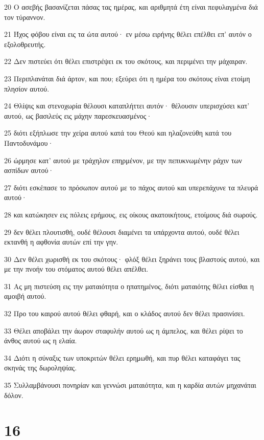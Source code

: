 \par 20 Ο ασεβής βασανίζεται πάσας τας ημέρας, και αριθμητά έτη είναι πεφυλαγμένα διά τον τύραννον.
\par 21 Ήχος φόβου είναι εις τα ώτα αυτού· εν μέσω ειρήνης θέλει επέλθει επ' αυτόν ο εξολοθρευτής.
\par 22 Δεν πιστεύει ότι θέλει επιστρέψει εκ του σκότους, και περιμένει την μάχαιραν.
\par 23 Περιπλανάται διά άρτον, και που; εξεύρει ότι η ημέρα του σκότους είναι ετοίμη πλησίον αυτού.
\par 24 Θλίψις και στενοχωρία θέλουσι καταπλήττει αυτόν· θέλουσιν υπερισχύσει κατ' αυτού, ως βασιλεύς εις μάχην παρεσκευασμένος·
\par 25 διότι εξήπλωσε την χείρα αυτού κατά του Θεού και ηλαζονεύθη κατά του Παντοδυνάμου·
\par 26 ώρμησε κατ' αυτού με τράχηλον επηρμένον, με την πεπυκνωμένην ράχιν των ασπίδων αυτού·
\par 27 διότι εσκέπασε το πρόσωπον αυτού με το πάχος αυτού και υπερεπάχυνε τα πλευρά αυτού·
\par 28 και κατώκησεν εις πόλεις ερήμους, εις οίκους ακατοικήτους, ετοίμους διά σωρούς.
\par 29 δεν θέλει πλουτισθή, ουδέ θέλουσι διαμένει τα υπάρχοντα αυτού, ουδέ θέλει εκτανθή η αφθονία αυτών επί την γην.
\par 30 Δεν θέλει χωρισθή εκ του σκότους· φλόξ θέλει ξηράνει τους βλαστούς αυτού, και με την πνοήν του στόματος αυτού θέλει απέλθει.
\par 31 Ας μη πιστεύση εις την ματαιότητα ο ηπατημένος, διότι ματαιότης θέλει είσθαι η αμοιβή αυτού.
\par 32 Προ του καιρού αυτού θέλει φθαρή, και ο κλάδος αυτού δεν θέλει πρασινίσει.
\par 33 Θέλει αποβάλει την άωρον σταφυλήν αυτού ως η άμπελος, και θέλει ρίψει το άνθος αυτού ως η ελαία.
\par 34 Διότι η σύναξις των υποκριτών θέλει ερημωθή, και πυρ θέλει καταφάγει τας σκηνάς της δωροληψίας.
\par 35 Συλλαμβάνουσι πονηρίαν και γεννώσι ματαιότητα, και η καρδία αυτών μηχανάται δόλον.

\chapter{16}

